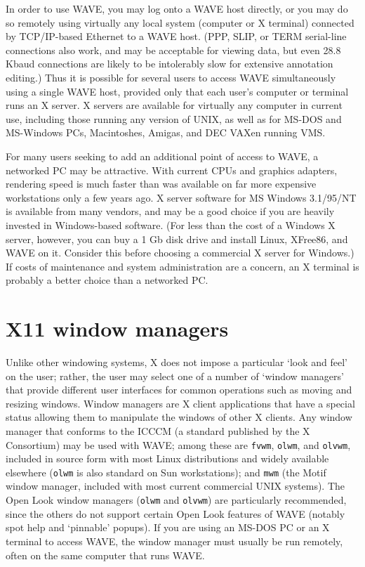 \documentclass[twoside]{book}
\newcommand{\WAVE}{{\sf WAVE}\xspace}
\begin{document}
In order to use \WAVE{}, you may log onto a \WAVE{} host directly, or you
may do so remotely using virtually any local system (computer or X
terminal) connected by TCP/IP-based Ethernet to a \WAVE{} host.  (PPP,
SLIP, or TERM serial-line connections also work, and may be acceptable
for viewing data, but even 28.8 Kbaud connections are likely to be
intolerably slow for extensive annotation editing.)  Thus it is
possible for several users to access \WAVE{} simultaneously using a
single \WAVE{} host, provided only that each user's computer or terminal
runs an X server.  X servers are available for virtually any computer
in current use, including those running any version of UNIX, as well
as for MS-DOS and MS-Windows PCs, Macintoshes, Amigas, and DEC VAXen
running VMS.

For many users seeking to add an additional point of access to \WAVE{}, a
networked PC may be attractive.  With current CPUs and graphics adapters,
rendering speed is much faster than was available on far more expensive
workstations only a few years ago.  X server software for MS Windows 3.1/95/NT
is available from many vendors, and may be a good choice if you are heavily
invested in Windows-based software.  (For less than the cost of a Windows X
server, however, you can buy a 1 Gb disk drive and install Linux, XFree86,
and \WAVE{} on it.  Consider this before choosing a commercial X server for
Windows.)  If costs of maintenance and system administration are a concern,
an X terminal is probably a better choice than a networked PC.

\section{X11 window managers}
Unlike other windowing systems, X does not impose a particular `look and feel'
on the user; rather, the user may select one of a number of `window managers'
that provide different user interfaces for common operations such as moving and
resizing windows.  Window managers are X client applications that have a
special status allowing them to manipulate the windows of other X clients.  Any
window manager that conforms to the ICCCM (a standard published by the X
Consortium) may be used with \WAVE{}; among these are {\tt fvwm},
{\tt olwm}, and {\tt olvwm},
included in source form with most Linux distributions
and widely available elsewhere ({\tt olwm} is also standard on Sun
workstations);  and {\tt mwm} (the Motif window manager, included with most
current commercial UNIX systems).  The Open Look window managers ({\tt olwm}
and {\tt olvwm}) are particularly recommended, since the others do not support
certain Open Look features of \WAVE{} (notably spot help and `pinnable'
popups).  If you
are using an MS-DOS PC or an X terminal to access \WAVE{}, the window
manager must usually be run remotely, often on the same computer that runs
\WAVE{}.
\end{document}
